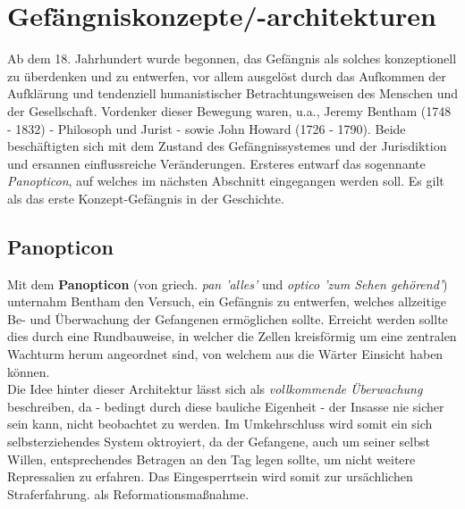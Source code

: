 \section{Gefängniskonzepte/-architekturen}
Ab dem 18. Jahrhundert wurde begonnen, das Gefängnis als solches konzeptionell zu überdenken und zu entwerfen, vor allem ausgelöst durch das Aufkommen der Aufklärung und tendenziell humanistischer Betrachtungsweisen des Menschen und der Gesellschaft. Vordenker dieser Bewegung waren, u.a., Jeremy Bentham (1748 - 1832) - Philosoph und Jurist - sowie John Howard (1726 - 1790). Beide beschäftigten sich mit dem Zustand des Gefängnissystemes und der Jurisdiktion und ersannen einflussreiche Veränderungen. Ersteres entwarf das sogennante \textit{Panopticon}, auf welches im nächsten Abschnitt eingegangen werden soll. Es gilt als das erste Konzept-Gefängnis in der Geschichte.

\subsection{Panopticon}
Mit dem \textbf{Panopticon} (von griech. \textit{pan 'alles'} und \textit{optico 'zum Sehen gehörend'}) unternahm Bentham den Versuch, ein Gefängnis zu entwerfen, welches allzeitige Be- und Überwachung der Gefangenen ermöglichen sollte. Erreicht werden sollte dies durch eine Rundbauweise, in welcher die Zellen kreisförmig um eine zentralen Wachturm herum angeordnet sind, von welchem aus die Wärter Einsicht haben können. \\
Die Idee hinter dieser Architektur lässt sich als \textit{vollkommende Überwachung} beschreiben, da - bedingt durch diese bauliche Eigenheit - der Insasse nie sicher sein kann, nicht beobachtet zu werden. Im Umkehrschluss wird somit ein sich selbsterziehendes System oktroyiert, da der Gefangene, auch um seiner selbst Willen, entsprechendes Betragen an den Tag legen sollte, um nicht weitere Repressalien zu erfahren. Das Eingesperrtsein wird somit zur ursächlichen Straferfahrung. als Reformationsmaßnahme.
